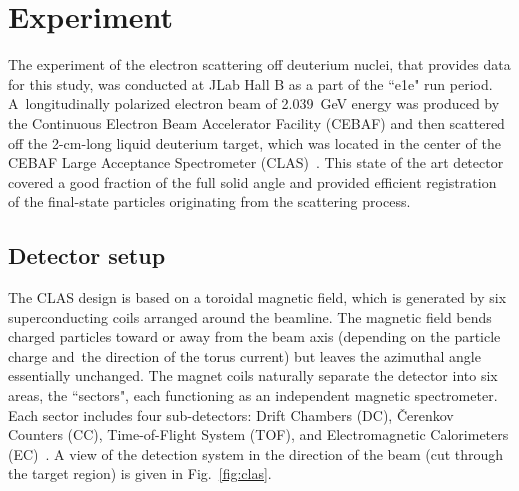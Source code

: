 \chapter{Experiment}
\label{Chapt:experiment}

The experiment of the electron scattering off deuterium nuclei, that provides data for this study, was conducted at JLab Hall B as a part of the ``e1e" run period. A~longitudinally polarized electron beam of 2.039~GeV energy was produced by the Continuous Electron Beam Accelerator Facility (CEBAF) and then scattered off the 2-cm-long liquid deuterium target, which was located in the center of the CEBAF Large Acceptance Spectrometer (CLAS)~\cite{Mecking:2003zu}. This state of the art detector covered a good fraction of the full solid angle and provided efficient registration of the final-state particles originating from the scattering process.





\section{Detector setup}
\label{Sect:detector}

The CLAS design is based on a toroidal magnetic field, which is generated by six superconducting coils arranged around the beamline. The magnetic field bends charged particles toward or away from the beam axis (depending on the particle charge and~the direction of the torus current) but leaves the azimuthal angle essentially unchanged. The magnet coils naturally separate the detector into six areas, the  ``sectors", each functioning as an independent magnetic spectrometer. Each sector includes four sub-detectors: Drift Chambers (DC), \v Cerenkov Counters (CC), Time-of-Flight System (TOF), and Electromagnetic Calorimeters (EC)~\cite{Mecking:2003zu}. A view of the detection system in the direction of the beam (cut through the target region) is given in Fig.~\ref{fig:clas}.


